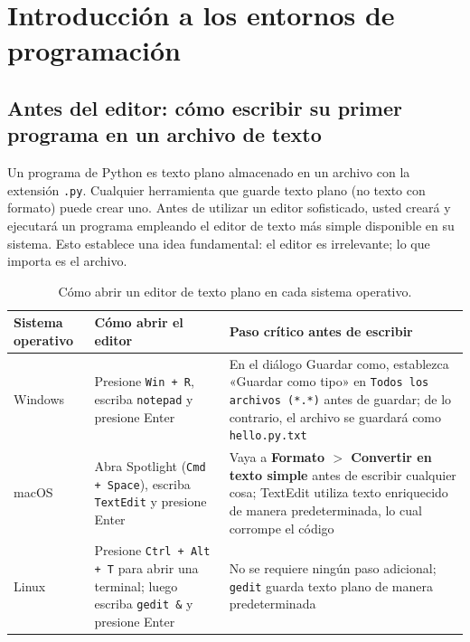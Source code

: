 \chapter{Introducción a los entornos de programación}
\label{ch:intro-prog}

\section{Antes del editor: cómo escribir su primer programa en un archivo de texto}
\label{sec:plaintext-first}

Un programa de Python es texto plano almacenado en un archivo con la
extensión \texttt{.py}. Cualquier herramienta que guarde texto plano (no
texto con formato) puede crear uno. Antes de utilizar un editor
sofisticado, usted creará y ejecutará un programa empleando el editor
de texto más simple disponible en su sistema. Esto establece una idea
fundamental: el editor es irrelevante; lo que importa es el archivo.

\begin{table}[htbp]
\centering
\caption{Cómo abrir un editor de texto plano en cada sistema operativo.}
\label{tab:text-editors}
\begin{tabular}{p{2.8cm} p{5.5cm} p{6.5cm}}
\toprule
\textbf{Sistema operativo} & \textbf{Cómo abrir el editor} & \textbf{Paso crítico antes de escribir} \\
\midrule
Windows &
Presione \texttt{Win + R}, escriba \texttt{notepad} y presione Enter &
En el diálogo Guardar como, establezca «Guardar como tipo» en \texttt{Todos los archivos (*.*)} antes de guardar; de lo contrario, el archivo se guardará como \texttt{hello.py.txt} \\
\midrule
macOS &
Abra Spotlight (\texttt{Cmd + Space}), escriba \texttt{TextEdit} y presione Enter &
Vaya a \textbf{Formato $>$ Convertir en texto simple} antes de escribir cualquier cosa; TextEdit utiliza texto enriquecido de manera predeterminada, lo cual corrompe el código \\
\midrule
Linux &
Presione \texttt{Ctrl + Alt + T} para abrir una terminal; luego escriba \texttt{gedit \&} y presione Enter &
No se requiere ningún paso adicional; \texttt{gedit} guarda texto plano de manera predeterminada \\
\bottomrule
\end{tabular}
\end{table}

